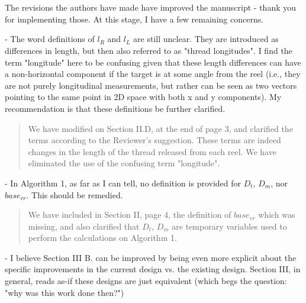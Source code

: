 \documentclass[journal,onecolumn,12pt]{IEEEtran}
\begin{document}
\section*{}

The revisions the authors have made have improved the manuscript - thank you for implementing those. At this stage, I have a few remaining concerns.

- The word definitions of $l_R$ and $l_L$ are still unclear. They are introduced as differences in length, but then also referred to as "thread longitudes". I find the term "longitude" here to be confusing given that these length differences can have a non-horizontal component if the target is at some angle from the reel (i.e., they are not purely longitudinal measurements, but rather can be seen as two vectors pointing to the same point in 2D space with both x and y components). My recommendation is that these definitions be further clarified.

\vspace{10pt} 
\begin{quotation}
{\color{blue}
We have modified on Section II.D, at the end of page 3, and clarified the terms according to the Reviewer's suggestion.  These terms are indeed changes in the length of the thread released from each reel.  We have eliminated the use of the confusing term "longitude".  
}
\end{quotation}
\vspace{10pt} 


- In Algorithm 1, as far as I can tell, no definition is provided for $D_t$, $D_m$, nor $base_{vr}$. This should be remedied.

\vspace{10pt} 
\begin{quotation}
{\color{blue}
We have included in Section II, page 4, the definition of $base_{vr}$ which was missing, and also clarified that $D_t$, $D_m$ are temporary variables used to perform the calculations on Algorithm 1.
}
\end{quotation}
\vspace{10pt} 

- I believe Section III B. can be improved by being even more explicit about the specific improvements in the current design vs. the existing design. Section III, in general, reads as-if these designs are just equivalent (which begs the question: "why was this work done then?")
\end{document}
